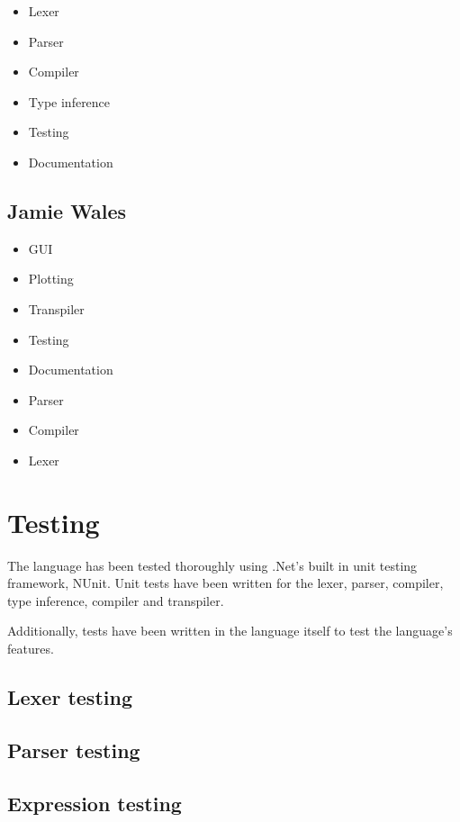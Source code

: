 \documentclass[a4paper, oneside, 11pt]{report}
\begin{document}
\begin{itemize}
    \item Lexer
    \item Parser
    \item Compiler
    \item Type inference
    \item Testing
    \item Documentation
\end{itemize}

\section{Jamie Wales}\label{sec:jamie-wales}

\begin{itemize}
    \item GUI
    \item Plotting
    \item Transpiler
    \item Testing
    \item Documentation
    \item Parser
    \item Compiler
    \item Lexer
\end{itemize}

\chapter{Testing}\label{ch:test}

The language has been tested thoroughly using .Net's built in unit testing framework, NUnit.
Unit tests have been written for the lexer, parser, compiler, type inference, compiler and transpiler.

Additionally, tests have been written in the language itself to test the language's features.

\section{Lexer testing}\label{sec:lexer-testing}

\section{Parser testing}\label{sec:parser-testing}

\section{Expression testing}\label{sec:arithmetic-expression-testing}
\end{document}
